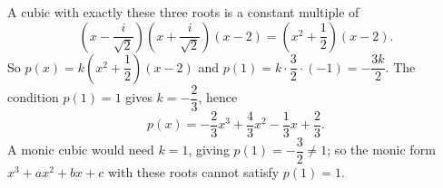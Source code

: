 A cubic with exactly these three roots is a constant multiple of
\[\left(x-\dfrac{i}{\sqrt2}\right)\left(x+\dfrac{i}{\sqrt2}\right)(x-2)=\left(x^2+\dfrac12\right)(x-2).\]
So $p(x)=k\left(x^2+\dfrac12\right)(x-2)$ and $p(1)=k\cdot\dfrac32\cdot(-1)=-\dfrac{3k}{2}$. The condition $p(1)=1$ gives $k=-\dfrac23$, hence
\[p(x)=\boxed{-\dfrac23x^3+\dfrac43x^2-\dfrac13x+\dfrac23}.\]
A monic cubic would need $k=1$, giving $p(1)=-\dfrac32\ne1$; so the monic form $x^3+ax^2+bx+c$ with these roots cannot satisfy $p(1)=1$.
